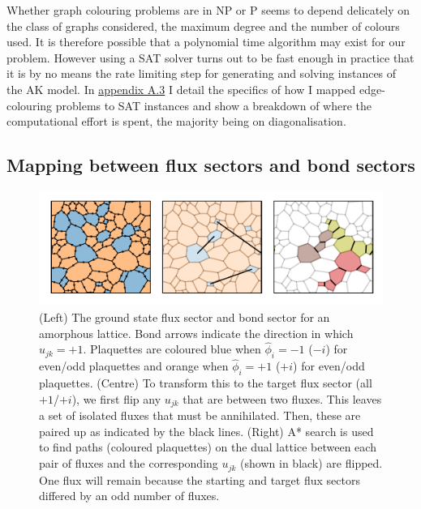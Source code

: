 Whether graph colouring problems are in NP or P seems to depend delicately on the class of graphs considered, the maximum degree and the number of colours used. It is therefore possible that a polynomial time algorithm may exist for our problem. However using a SAT solver turns out to be fast enough in practice that it is by no means the rate limiting step for generating and solving instances of the AK model. In \protect\hyperlink{app-lattice-generation}{appendix A.3} I detail the specifics of how I mapped edge-colouring problems to SAT instances and show a breakdown of where the computational effort is spent, the majority being on diagonalisation.

\hypertarget{mapping-between-flux-sectors-and-bond-sectors}{%
\subsection{Mapping between flux sectors and bond sectors}\label{mapping-between-flux-sectors-and-bond-sectors}}

\hypertarget{fig:flux_finding}{%
\begin{figure}
\centering
\includegraphics[width=1\textwidth,height=\textheight]{figure_code/amk_chapter/flux_finding/flux_finding}
\caption[{Finding Bond Sectors from Flux Sectors}]{(Left) The ground state flux sector and bond sector for an amorphous lattice. Bond arrows indicate the direction in which \(u_{jk} = +1\). Plaquettes are coloured blue when \(\hat{\phi}_i = -1\) (\(-i\)) for even/odd plaquettes and orange when \(\hat{\phi}_i = +1\) (\(+i\)) for even/odd plaquettes. (Centre) To transform this to the target flux sector (all \(+1\)/\(+i\)), we first flip any \(u_{jk}\) that are between two fluxes. This leaves a set of isolated fluxes that must be annihilated. Then, these are paired up as indicated by the black lines. (Right) A* search is used to find paths (coloured plaquettes) on the dual lattice between each pair of fluxes and the corresponding \(u_{jk}\) (shown in black) are flipped. One flux will remain because the starting and target flux sectors differed by an odd number of fluxes.}
\label{fig:flux_finding}
\end{figure}
}


